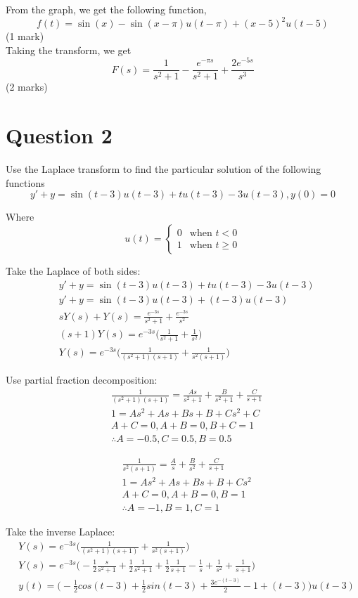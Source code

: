 \documentclass[12pt]{article}
\begin{document}
\noindent From the graph, we get the following function, $$f(t) = \sin(x) - \sin(x-\pi)u(t-\pi) + (x-5)^2u(t-5)$$ \hfill (1 mark) \\ Taking the transform, we get $$F(s) = \frac{1}{s^2+1} - \frac{e^{-\pi s}}{s^2+1} + \frac{2e^{-5s}}{s^3}$$ \hfill (2 marks)

\section*{Question 2}

Use the Laplace transform to find the particular solution of the following functions
$$y' + y = \sin(t - 3)u(t - 3) + tu(t - 3) - 3u(t - 3), y(0) = 0$$


\noindent Where
\[
 u(t) =
  \begin{cases}
    0 &\text{when } t < 0 \\
    1 &\text{when } t \ge 0
  \end{cases}
\]

Take the Laplace of both sides:
\begin{align*}
  &y' + y = \sin(t - 3)u(t - 3) + tu(t - 3) - 3u(t - 3)
  \\ &y' + y = \sin(t - 3)u(t - 3) + (t - 3)u(t - 3)
  \\ &sY(s) + Y(s) = \frac{e^{-3s}}{s^2 + 1} + \frac{e^{-3s}}{s^2}
  \\ &(s + 1)Y(s) = e^{-3s}\bigg(\frac{1}{s^2 + 1} + \frac{1}{s^2}\bigg)
  \\ &Y(s) = e^{-3s}\bigg(\frac{1}{(s^2 + 1)(s + 1)} + \frac{1}{s^2(s + 1)}\bigg) \tag{1 mark}
\end{align*}

Use partial fraction decomposition:
\begin{align*}
  &\frac{1}{(s^2 + 1)(s + 1)} = \frac{As}{s^2 + 1} + \frac{B}{s^2 + 1} + \frac{C}{s + 1}
  \\&1 = As^2 + As + Bs + B + Cs^2 + C
  \\& A + C = 0, A + B = 0, B + C = 1
    \\& \therefore A = -0.5, C = 0.5, B = 0.5 \tag{1 mark}
\end{align*}

\begin{align*}
  &\frac{1}{s^2(s + 1)} = \frac{A}{s} + \frac{B}{s^2} + \frac{C}{s + 1}
  \\&1 = As^2 + As + Bs + B + Cs^2
  \\& A + C = 0, A + B = 0, B = 1
    \\& \therefore A = -1, B = 1, C = 1 \tag{1 mark}
\end{align*}

Take the inverse Laplace:
\begin{align*}
  &Y(s) = e^{-3s}\bigg(\frac{1}{(s^2 + 1)(s + 1)} + \frac{1}{s^2(s + 1)}\bigg)
  \\ &Y(s) = e^{-3s}\bigg(-\frac{1}{2}\frac{s}{s^2 + 1} + \frac{1}{2}\frac{1}{s^2 + 1} + \frac{1}{2}\frac{1}{s + 1} -\frac{1}{s} + \frac{1}{s^2} + \frac{1}{s + 1}\bigg)
    \\ &y(t) = \bigg(-\frac{1}{2}cos(t - 3) + \frac{1}{2}sin(t - 3) + \frac{3e^{-(t-3)}}{2} - 1 + (t - 3)\bigg)u(t - 3) \tag{2 marks}
\end{align*}
\end{document}
